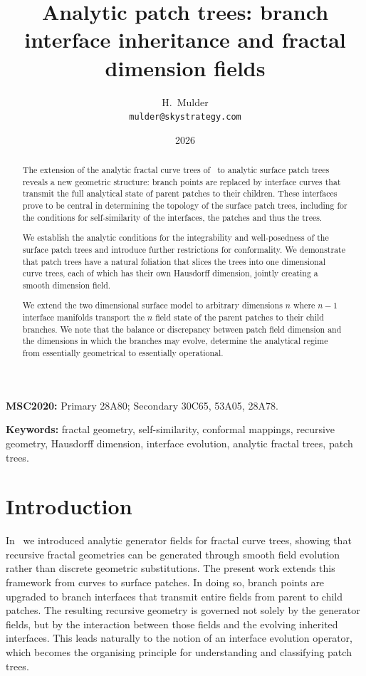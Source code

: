 \documentclass[11pt,a4paper]{article}
\title{Analytic patch trees: branch interface inheritance and fractal dimension fields}
\author{H.\ Mulder\\
\small\texttt{mulder@skystrategy.com}}
\date{2026}
\begin{document}
\maketitle

\begin{abstract}
The extension of the analytic fractal curve trees of~\cite{mulder2026}
to analytic surface patch trees reveals a new
geometric structure: branch points are replaced by interface curves
that transmit the full analytical state of parent patches to their
children. These interfaces prove to be central in 
determining the topology of the surface patch trees, including 
for the conditions for self-similarity of the interfaces, the patches
and thus the trees.

We establish the analytic conditions for the integrability and well-posedness
of the surface patch trees and introduce further restrictions for 
conformality. We demonstrate that patch trees have a natural foliation that
slices the trees into one dimensional curve trees, each of which has their
own Hausdorff dimension, jointly creating a smooth dimension field.

We extend the two dimensional surface model to arbitrary dimensions $n$ 
where $n-1$ interface manifolds transport the $n$ field state of the parent
patches to their child branches. We note that the balance or discrepancy between
patch field dimension and the dimensions in which the branches may evolve, 
determine the analytical regime from essentially geometrical to essentially
operational.
\end{abstract}


\bigskip

\noindent\textbf{MSC2020:}
Primary 28A80;
Secondary 30C65, 53A05, 28A78.

\medskip

\noindent\textbf{Keywords:}
fractal geometry,
self-similarity,
conformal mappings,
recursive geometry,
Hausdorff dimension,
interface evolution,
analytic fractal trees,
patch trees.

\section{Introduction}
\label{sec:introduction}

In~\cite{mulder2026} we introduced analytic generator fields for fractal curve trees, showing 
that recursive fractal geometries can be generated through smooth field evolution 
rather than discrete geometric substitutions. The present work extends this framework 
from curves to surface patches. In doing so, branch points are upgraded to branch 
interfaces that transmit entire fields from parent to child patches. The resulting 
recursive geometry is governed not solely by the generator fields, but by the interaction 
between those fields and the evolving inherited interfaces. This leads naturally to the 
notion of an interface evolution operator, which becomes the organising principle for 
understanding and classifying patch trees.
\end{document}
